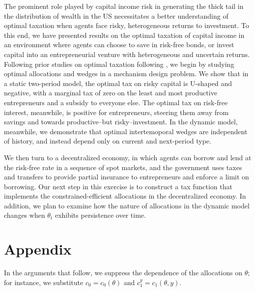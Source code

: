 \documentclass[11pt]{article}
\begin{document}
The prominent role played by capital income risk in generating the thick tail in the distribution of wealth in the US necessitates a better understanding of optimal taxation when agents face risky, heterogeneous returns to investment. To this end, we have presented results on the optimal taxation of capital income in an environment where agents can choose to save in risk-free bonds, or invest capital into an entrepreneurial venture with heterogeneous and uncertain returns. Following prior studies on optimal taxation following \cite{mirrlees1971exploration}, we begin by studying optimal allocations and wedges in a mechanism design problem. We show that in a static two-period model, the optimal tax on risky capital is U-shaped and negative, with a marginal tax of zero on the least and most productive entrepreneurs and a subsidy to everyone else. The optimal tax on risk-free interest, meanwhile, is positive for entrepreneurs, steering them away from savings and towards productive--but risky--investment. In the dynamic model, meanwhile, we demonstrate that optimal intertemoporal wedges are independent of history, and instead depend only on current and next-period type. 

We then turn to a decentralized economy, in which agents can borrow and lend at the risk-free rate in a sequence of spot markets, and the government uses taxes and transfers to provide    partial insurance to entrepreneurs and enforce a limit on borrowing. Our next step in this exercise is to construct a tax function that implements the constrained-efficient allocations in the decentralized economy. In addition, we plan to examine how the nature of allocations in the dynamic model changes when \( \theta_t \) exhibits persistence over time. 



\newpage
\section*{Appendix}
\setcounter{equation}{0}
\renewcommand{\theequation}{A.\arabic{equation}}

In the arguments that follow, we suppress the dependence of the allocations on \( \theta \); for instance, we substitute \( c_0 = c_0(\theta) \) and \( c_1^y = c_1\left( \theta,y \right) \).
\end{document}
